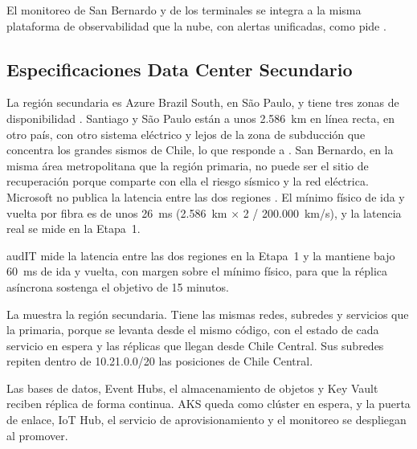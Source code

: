 El monitoreo de San Bernardo y de los terminales se integra a la misma plataforma de observabilidad que
la nube, con alertas unificadas, como pide .

\subsection{Especificaciones Data Center Secundario}\label{sec:4-dc-secundario}

La región secundaria es Azure Brazil South, en São Paulo, y tiene tres zonas de disponibilidad
\parencite{ms_regions}. Santiago y São Paulo están a unos 2.586~km en línea recta, en
otro país, con otro sistema eléctrico y lejos de la zona de subducción que concentra los grandes
sismos de Chile, lo que responde a . San Bernardo, en la misma área metropolitana
que la región primaria, no puede ser el sitio de recuperación porque comparte con ella el riesgo
sísmico y la red eléctrica. Microsoft no publica la latencia entre las dos regiones
\parencite{ms_latencia}. El mínimo físico de ida y vuelta por fibra es de unos 26~ms (2.586~km × 2 /
200.000~km/s), y la latencia real se mide en la Etapa~1.

\begin{compromiso}[metrica={Latencia de ida y vuelta entre Chile Central y Brazil South bajo 60 ms}, verifica={Medición en la Etapa 1, antes del hito H5}, fuente={Mínimo físico de 26 ms calculado en esta sección}]
audIT mide la latencia entre las dos regiones en la Etapa~1 y la mantiene bajo 60~ms de ida y vuelta,
con margen sobre el mínimo físico, para que la réplica asíncrona sostenga el objetivo de 15 minutos.
\end{compromiso}

La  muestra la región secundaria. Tiene las mismas redes, subredes y servicios
que la primaria, porque se levanta desde el mismo código, con el estado de cada servicio en espera y las
réplicas que llegan desde Chile Central. Sus subredes repiten dentro de 10.21.0.0/20 las posiciones de
Chile Central.


Las bases de datos, Event Hubs, el almacenamiento de objetos y Key Vault reciben réplica de forma
continua. AKS queda como clúster en espera, y la puerta de enlace, IoT Hub, el servicio de
aprovisionamiento y el monitoreo se despliegan al promover.

